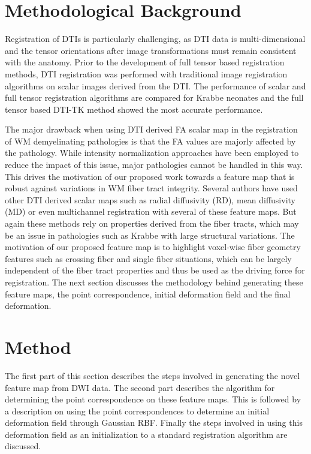 \documentclass{llncs}
\begin{document}
\section{Methodological Background}
\label{sec:methodBackground}
Registration of DTIs is particularly challenging, as DTI data is multi-dimensional and the tensor orientations after image transformations must remain consistent with the anatomy. Prior to the development of full tensor based registration methods, DTI registration was performed with traditional image registration algorithms on scalar images derived from the DTI. The performance of scalar and full tensor registration algorithms are compared for Krabbe neonates \cite{Wang11} and the full tensor based DTI-TK \cite{Zhang06} method showed the most accurate performance. %

The major drawback when using DTI derived FA scalar map in the registration of WM demyelinating pathologies is that the FA values are majorly affected by the pathology. While intensity normalization approaches have been employed to reduce the impact of this issue, major pathologies cannot be handled in this way. This drives the motivation of our proposed work towards a feature map that is robust against variations in WM fiber tract integrity. Several authors have used other DTI derived scalar maps such as radial diffusivity (RD), mean diffusivity (MD) or even multichannel registration \cite{Alexand99} with several of these feature maps. But again these methods rely on properties derived from the fiber tracts, which may be an issue in pathologies such as Krabbe with large structural variations. The motivation of our proposed feature map is to highlight voxel-wise fiber geometry features such as crossing fiber and single fiber situations, which can be largely independent of the fiber tract properties and thus be used  as the driving force for registration. The next section discusses the methodology behind generating these feature maps, the point correspondence, initial deformation field and the final deformation.


\section{Method}
\label{sec:method}
The first part of this section describes the steps involved in generating the novel feature map from DWI data. The second part describes the algorithm for determining the point correspondence on these feature maps. This is followed by a description on using the point correspondences to determine an initial deformation field through Gaussian RBF. Finally the steps involved in using this deformation field as an initialization to a standard registration algorithm are discussed.
\end{document}
